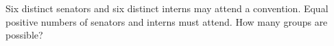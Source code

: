 Six distinct senators and six distinct interns may attend a convention. Equal positive numbers of senators and interns must attend. How many groups are possible?
